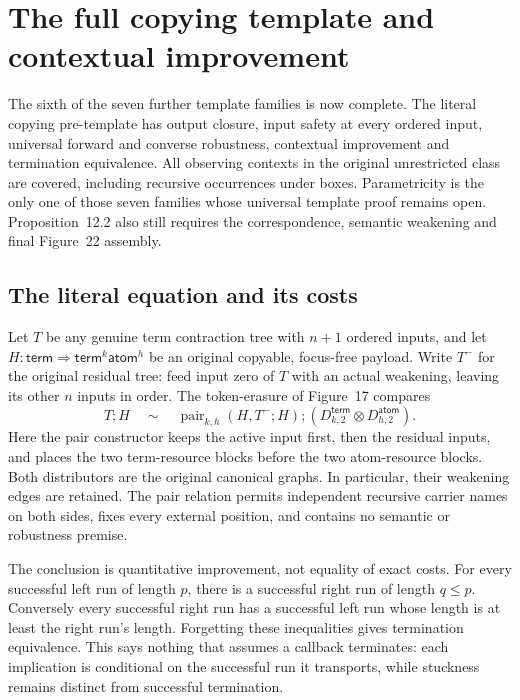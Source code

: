 \clearpage
\section{The full copying template and contextual improvement}
\label{sec:copying-full-copying-template}
The sixth of the seven further template families is now complete. The
literal copying pre-template has output closure, input safety at every
ordered input, universal forward and converse robustness, contextual
improvement and termination equivalence. All observing contexts in the
original unrestricted class are covered, including recursive occurrences
under boxes. Parametricity is the only one of those seven families whose
universal template proof remains open. Proposition~12.2 also still requires
the correspondence, semantic weakening and final Figure~22 assembly.

\subsection{The literal equation and its costs}
Let $T$ be any genuine term contraction tree with $n+1$ ordered inputs,
and let $H:\mathsf{term}\Rightarrow\mathsf{term}^k\mathsf{atom}^h$ be an
original copyable, focus-free payload. Write $T^{-}$ for the original
residual tree: feed input zero of $T$ with an actual weakening, leaving its
other $n$ inputs in order. The token-erasure of Figure~17 compares
\[
 T;H\quad\sim\quad
 \operatorname{pair}_{k,h}(H,T^{-};H);
       (D^{\mathsf{term}}_{k,2}\otimes D^{\mathsf{atom}}_{h,2}).
\]
Here the pair constructor keeps the active input first, then the residual
inputs, and places the two term-resource blocks before the two atom-resource
blocks. Both distributors are the original canonical graphs. In particular,
their weakening edges are retained. The pair relation permits independent
recursive carrier names on both sides, fixes every external position, and
contains no semantic or robustness premise.

The conclusion is quantitative improvement, not equality of exact costs.
For every successful left run of length $p$, there is a successful right
run of length $q\leq p$. Conversely every successful right run has a
successful left run whose length is at least the right run's length.
Forgetting these inequalities gives termination equivalence. This says
nothing that assumes a callback terminates: each implication is conditional
on the successful run it transports, while stuckness remains distinct from
successful termination.

